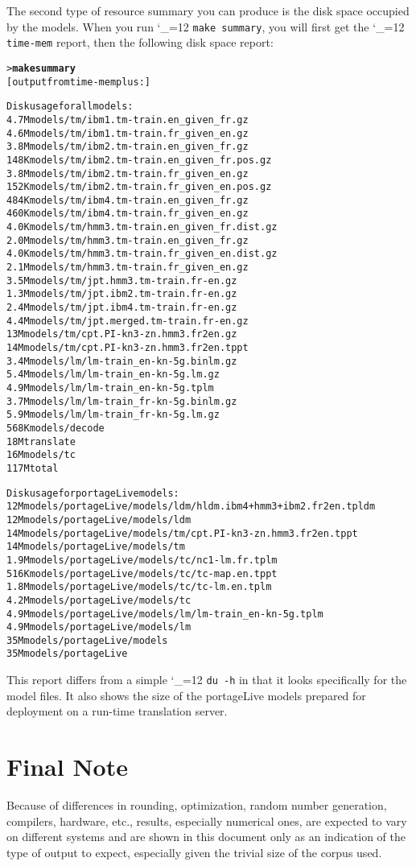\documentclass[11pt,letterpaper]{article}
\def\code{\begingroup\catcode`\_=12 \codex}
\newcommand{\codex}[1]{\texttt{#1}\endgroup}
\begin{document}
The second type of resource summary you can produce is the disk space occupied
by the models.  When you run \code{make summary}, you will first get the
\code{time-mem} report, then the following disk space report:
\begin{small}
\begin{alltt}
   > \textbf{make summary}
   [output from time-mem plus:]

   Disk usage for all models:
   4.7M    models/tm/ibm1.tm-train.en_given_fr.gz
   4.6M    models/tm/ibm1.tm-train.fr_given_en.gz
   3.8M    models/tm/ibm2.tm-train.en_given_fr.gz
   148K    models/tm/ibm2.tm-train.en_given_fr.pos.gz
   3.8M    models/tm/ibm2.tm-train.fr_given_en.gz
   152K    models/tm/ibm2.tm-train.fr_given_en.pos.gz
   484K    models/tm/ibm4.tm-train.en_given_fr.gz
   460K    models/tm/ibm4.tm-train.fr_given_en.gz
   4.0K    models/tm/hmm3.tm-train.en_given_fr.dist.gz
   2.0M    models/tm/hmm3.tm-train.en_given_fr.gz
   4.0K    models/tm/hmm3.tm-train.fr_given_en.dist.gz
   2.1M    models/tm/hmm3.tm-train.fr_given_en.gz
   3.5M    models/tm/jpt.hmm3.tm-train.fr-en.gz
   1.3M    models/tm/jpt.ibm2.tm-train.fr-en.gz
   2.4M    models/tm/jpt.ibm4.tm-train.fr-en.gz
   4.4M    models/tm/jpt.merged.tm-train.fr-en.gz
   13M     models/tm/cpt.PI-kn3-zn.hmm3.fr2en.gz
   14M     models/tm/cpt.PI-kn3-zn.hmm3.fr2en.tppt
   3.4M    models/lm/lm-train_en-kn-5g.binlm.gz
   5.4M    models/lm/lm-train_en-kn-5g.lm.gz
   4.9M    models/lm/lm-train_en-kn-5g.tplm
   3.7M    models/lm/lm-train_fr-kn-5g.binlm.gz
   5.9M    models/lm/lm-train_fr-kn-5g.lm.gz
   568K    models/decode
   18M     translate
   16M     models/tc
   117M    total

   Disk usage for portageLive models:
   12M     models/portageLive/models/ldm/hldm.ibm4+hmm3+ibm2.fr2en.tpldm
   12M     models/portageLive/models/ldm
   14M     models/portageLive/models/tm/cpt.PI-kn3-zn.hmm3.fr2en.tppt
   14M     models/portageLive/models/tm
   1.9M    models/portageLive/models/tc/nc1-lm.fr.tplm
   516K    models/portageLive/models/tc/tc-map.en.tppt
   1.8M    models/portageLive/models/tc/tc-lm.en.tplm
   4.2M    models/portageLive/models/tc
   4.9M    models/portageLive/models/lm/lm-train_en-kn-5g.tplm
   4.9M    models/portageLive/models/lm
   35M     models/portageLive/models
   35M     models/portageLive
\end{alltt}
\end{small}

This report differs from a simple \code{du -h} in that it looks specifically
for the model files. It also shows the size of the portageLive models prepared
for deployment on a run-time translation server.

\section*{Final Note}
Because of differences in rounding, optimization, random number generation,
compilers, hardware, etc., results, especially numerical ones, are expected to
vary on different systems and are shown in this document only as an indication
of the type of output to expect, especially given the trivial size of the
corpus used.
\end{document}
